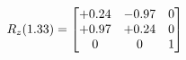 \documentclass[preview]{standalone}
\begin{document}
\begin{align*}
\special{dvisvgm:raw <g id='unique000'>}R_{z}(1.33) = \begin{bmatrix}+0.24 & -0.97 & 0 \\+0.97 & +0.24 & 0 \\0 & 0 & 1\end{bmatrix}\special{dvisvgm:raw </g>}
\end{align*}
\end{document}
